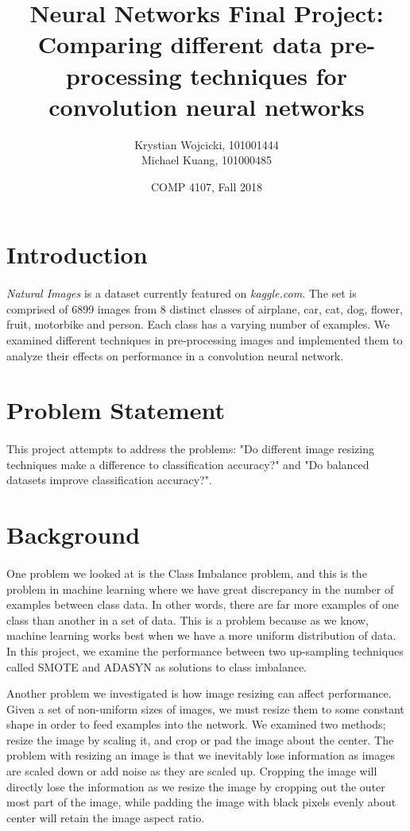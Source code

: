 \documentclass{article}
\title{Neural Networks Final Project: \\
	\large{Comparing different data pre-processing techniques for convolution neural networks}}
\author{Krystian Wojcicki, 101001444 \\ Michael Kuang, 101000485}
\date{COMP 4107, Fall 2018}
\begin{document}
\maketitle

\newpage

\section{Introduction}
\paragraph{}
{\em Natural Images} is a dataset currently featured on {\em kaggle.com}. The set is comprised of 6899 images from 8 distinct classes of airplane, car, cat, dog, flower, fruit, motorbike and person. Each class has a varying number of examples. We examined different techniques in pre-processing images and implemented them to analyze their effects on performance in a convolution neural network. 

\section{Problem Statement}
\paragraph{}
This project attempts to address the problems: "Do different image resizing techniques make a difference to classification accuracy?" and "Do balanced datasets improve classification accuracy?".

\section{Background}
\paragraph{}
One problem we looked at is the Class Imbalance problem, and this is the problem in machine learning where we have great discrepancy in the number of examples between class data. In other words, there are far more examples of one class than another in a set of data. This is a problem because as we know, machine learning works best when we have a more uniform distribution of data. In this project, we examine the performance between two up-sampling techniques called SMOTE and ADASYN as solutions to class imbalance. 
\par
Another problem we investigated is how image resizing can affect performance. Given a set of non-uniform sizes of images, we must resize them to some constant shape in order to feed examples into the network. We examined two methods; resize the image by scaling it, and crop or pad the image about the center. The problem with resizing an image is that we inevitably lose information as images are scaled down or add noise as they are scaled up. Cropping the image will directly lose the information as we resize the image by cropping out the outer most part of the image, while padding the image with black pixels evenly about center will retain the image aspect ratio.
\end{document}
